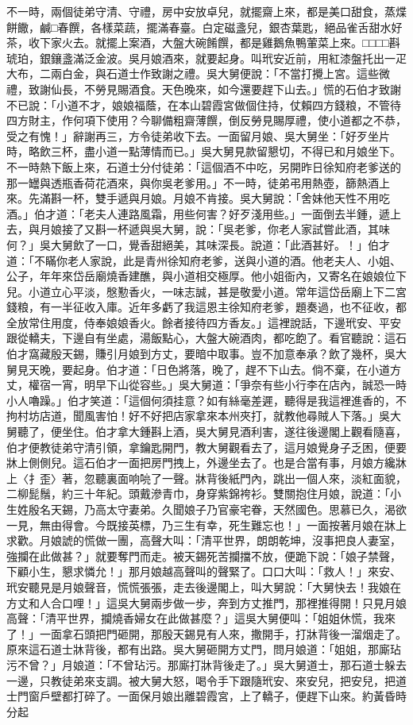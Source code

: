 \begin{showcontents}{}
不一時，兩個徒弟守清、守禮，房中安放卓兒，就擺齋上來，都是美口甜食，蒸煠餅饊，鹹□春饌，各樣菜蔬，擺滿春臺。白定磁盞兒，銀杏葉匙，絕品雀舌甜水好茶，收下家火去。就擺上案酒，大盤大碗餚饌，都是雞鵝魚鴨葷菜上來。□□□□斟琥珀，銀鑲盞滿泛金波。吳月娘酒來，就要起身。叫玳安近前，用紅漆盤托出一疋大布，二兩白金，與石道士作致謝之禮。吳大舅便說：「不當打攪上宮。這些微禮，致謝仙長，不勞見賜酒食。天色晚來，如今還要趕下山去。」慌的石伯才致謝不已說：「小道不才，娘娘福蔭，在本山碧霞宮做個住持，仗賴四方錢粮，不管待四方財主，作何項下使用？今聊備粗齋薄饌，倒反勞見賜厚禮，使小道都之不恭，受之有愧！」辭謝再三，方令徒弟收下去。一面留月娘、吳大舅坐：「好歹坐片時，略飲三杯，盡小道一點薄情而已。」吳大舅見款留懇切，不得已和月娘坐下。不一時熱下飯上來，石道士分付徒弟：「這個酒不中吃，另開昨日徐知府老爹送的那一罎與透瓶香荷花酒來，與你吳老爹用。」不一時，徒弟弔用熱壺，篩熱酒上來。先滿斟一杯，雙手遞與月娘。月娘不肯接。吳大舅說：「舍妹他天性不用吃酒。」伯才道：「老夫人連路風霜，用些何害？好歹淺用些。」一面倒去半鍾，遞上去，與月娘接了又斟一杯遞與吳大舅，說：「吳老爹，你老人家試嘗此酒，其味何？」吳大舅飲了一口，覺香甜絕美，其味深長。說道：「此酒甚好。！」伯才道：「不瞞你老人家說，此是青州徐知府老爹，送與小道的酒。他老夫人、小姐、公子，年年來岱岳廟燒香建醮，與小道相交極厚。他小姐衙內，又寄名在娘娘位下兒。小道立心平淡，慇懃香火，一味志誠，甚是敬愛小道。常年這岱岳廟上下二宮錢粮，有一半征收入庫。近年多虧了我這恩主徐知府老爹，題奏過，也不征收，都全放常住用度，侍奉娘娘香火。餘者接待四方香友。」這裡說話，下邊玳安、平安跟從轎夫，下邊自有坐處，湯飯點心，大盤大碗酒肉，都吃飽了。看官聽說：這石伯才窩藏殷天錫，賺引月娘到方丈，要暗中取事。豈不加意奉承？飲了幾杯，吳大舅見天晚，要起身。伯才道：「日色將落，晚了，趕不下山去。倘不棄，在小道方丈，權宿一宵，明早下山從容些。」吳大舅道：「爭奈有些小行李在店內，誠恐一時小人嚕躁。」伯才笑道：「這個何須挂意？如有絲毫差遲，聽得是我這裡進香的，不拘村坊店道，聞風害怕！好不好把店家拿來本州夾打，就教他尋賊人下落。」吳大舅聽了，便坐住。伯才拿大鍾斟上酒，吳大舅見酒利害，遂往後邊閣上觀看隨喜，伯才便教徒弟守清引領，拿鑰匙開門，教大舅觀看去了，這月娘覺身子乏困，便要牀上側側兒。這石伯才一面把房門拽上，外邊坐去了。也是合當有事，月娘方纔牀上〈扌歪〉著，忽聽裏面响喨了一聲。牀背後紙門內，跳出一個人來，淡紅面貌，二柳髭鬚，約三十年紀。頭戴滲青巾，身穿紫錦袴衫。雙關抱住月娘，說道：「小生姓殷名天錫，乃高太守妻弟。久聞娘子乃官豪宅眷，天然國色。思慕已久，渴欲一見，無由得會。今既接英標，乃三生有幸，死生難忘也！」一面按著月娘在牀上求歡。月娘諕的慌做一團，高聲大叫：「清平世界，朗朗乾坤，沒事把良人妻室，強攔在此做甚？」就要奪門而走。被天錫死苦攔擋不放，便跪下說：「娘子禁聲，下顧小生，懇求憐允！」那月娘越高聲叫的聲緊了。口口大叫：「救人！」來安、玳安聽見是月娘聲音，慌慌張張，走去後邊閣上，叫大舅說：「大舅快去！我娘在方丈和人合口哩！」這吳大舅兩步做一步，奔到方丈推門，那裡推得開！只見月娘高聲：「清平世界，攔燒香婦女在此做甚麼？」這吳大舅便叫：「姐姐休慌，我來了！」一面拿石頭把門砸開，那殷天錫見有人來，撒開手，打牀背後一溜烟走了。原來這石道士牀背後，都有出路。吳大舅砸開方丈門，問月娘道：「姐姐，那廝玷污不曾？」月娘道：「不曾玷污。那廝打牀背後走了。」吳大舅道士，那石道士躲去一邊，只教徒弟來支調。被大舅大怒，喝令手下跟隨玳安、來安兒，把安兒，把道士門窗戶壁都打碎了。一面保月娘出離碧霞宮，上了轎子，便趕下山來。約黃昏時分起
\end{showcontents}
